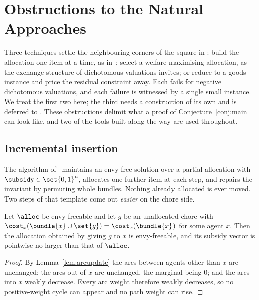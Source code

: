 
\section{Obstructions to the Natural Approaches}
\label{sec:obstructions}

Three techniques settle the neighbouring corners of the square in
: build the allocation one item at a time, as in~\cite{BKNS22};
select a welfare-maximising allocation, as the exchange structure of dichotomous
valuations invites; or reduce to a goods instance and price the residual
constraint away. Each fails for negative dichotomous valuations, and each failure
is witnessed by a single small instance. We treat the first two here; the third
needs a construction of its own and is deferred to . These
obstructions delimit what a proof of Conjecture~\ref{conj:main} can look like,
and two of the tools built along the way are used throughout.

\subsection{Incremental insertion}
\label{sec:main-insertion}

The algorithm of~\cite{BKNS22} maintains an envy-free solution over a partial
allocation with $\subsidy \in \set{0,1}^n$, allocates one further item at each
step, and repairs the invariant by permuting whole bundles. Nothing already
allocated is ever moved. Two steps of that template come out \emph{easier} on
the chore side.

\begin{theorem}
\label{main:freeinsert}
Let $\alloc$ be envy-freeable and let $g$ be an unallocated chore with
$\cost_x(\bundle{x} \cup \set{g}) = \cost_x(\bundle{x})$ for some agent $x$.
Then the allocation obtained by giving $g$ to $x$ is envy-freeable, and its
subsidy vector is pointwise no larger than that of $\alloc$.
\end{theorem}

\begin{proof}
By Lemma~\ref{lem:arcupdate} the arcs between agents other than $x$ are
unchanged; the arcs out of $x$ are unchanged, the marginal being $0$; and the
arcs into $x$ weakly decrease. Every arc weight therefore weakly decreases, so
no positive-weight cycle can appear and no path weight can rise.
\end{proof}

